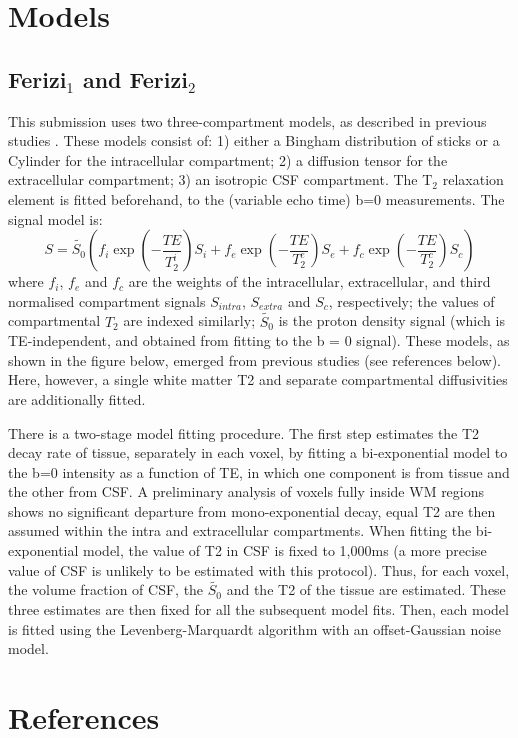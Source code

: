 \documentclass[3p]{elsarticle}
\begin{document}
\section{Models}

\subsection{Ferizi$_1$ and Ferizi$_2$}
This submission uses two three-compartment models, as described in previous studies \citep{ferizi_mrm,ferizi_miccai}. These models consist of: 1) either a Bingham distribution of sticks or a Cylinder for the intracellular compartment; 2) a diffusion tensor for the extracellular compartment; 3) an isotropic CSF compartment. 
The T$_2$ relaxation element is fitted beforehand, to the (variable echo time) b=0 measurements. The signal model is:  
\begin{equation}
S = \tilde{S_{0}} \left(f_{i}  \exp{(-\frac{TE}{T_2^i})}  S_{i} + f_{e}  \exp{(-\frac{TE}{T_2^e})}  S_{e} + f_{c}  \exp{(-\frac{TE}{T_2^c})}  S_{c}\right)
\label{eq:modelTE}
\end{equation}
where $f_{i}$, $f_{e}$ and $f_{c}$ are the weights of the intracellular, extracellular, and third normalised compartment signals $S_{intra}$, $S_{extra}$ and $S_{c}$, respectively; the values of compartmental $T_2$ are indexed similarly; $\tilde{S_{0}}$ is the proton density signal (which is TE-independent, and obtained from fitting to the b = 0 signal).
These models, as shown in the figure below,  emerged from previous studies (see references below). Here, however, a single white matter T2 and separate compartmental diffusivities are additionally fitted.

There is a two-stage model fitting procedure. The first step estimates the T2 decay rate of tissue, separately in each voxel, by fitting a bi-exponential model to the b=0 intensity as a function of TE, in which one component is from tissue and the other from CSF. A preliminary analysis of voxels fully inside WM regions shows no significant departure from mono-exponential decay, equal T2 are then assumed within the intra and extracellular compartments. When fitting the bi-exponential model, the value of T2 in CSF is fixed to 1,000ms (a more precise value of CSF is unlikely to be estimated with this protocol). Thus, for each voxel, the volume fraction of CSF, the $\tilde{S_{0}}$ and the T2 of the tissue are estimated. These three estimates are then fixed for all the subsequent model fits. Then, each model is fitted using the Levenberg-Marquardt algorithm with an offset-Gaussian noise model. 


\section*{References}

\end{document}
